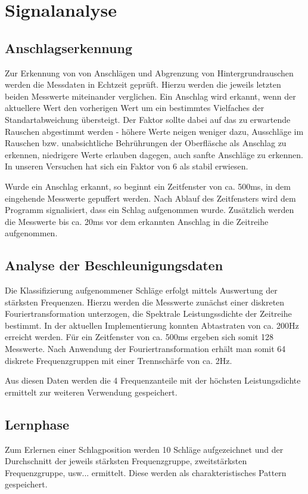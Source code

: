 \section*{Signalanalyse}
\subsection*{Anschlagserkennung}
Zur Erkennung von von Anschlägen und Abgrenzung von Hintergrundrauschen werden die Messdaten in Echtzeit geprüft. Hierzu werden die jeweils letzten beiden Messwerte miteinander verglichen. Ein Anschlag wird erkannt, wenn der aktuellere Wert den vorherigen Wert um ein bestimmtes Vielfaches der Standartabweichung übersteigt. Der Faktor sollte dabei auf das zu erwartende Rauschen abgestimmt werden - höhere Werte neigen weniger dazu, Ausschläge im Rauschen bzw. unabsichtliche Behrührungen der Oberfläsche als Anschlag zu erkennen, niedrigere Werte erlauben dagegen, auch sanfte Anschläge zu erkennen. In unseren Versuchen hat sich ein Faktor von 6 als stabil erwiesen.

Wurde ein Anschlag erkannt, so beginnt ein Zeitfenster von ca. 500ms, in dem eingehende Messwerte gepuffert werden. Nach Ablauf des Zeitfensters wird dem Programm signalisiert, dass ein Schlag aufgenommen wurde. Zusätzlich werden die Messwerte bis ca. 20ms vor dem erkannten Anschlag in die Zeitreihe aufgenommen.

\subsection*{Analyse der Beschleunigungsdaten}
Die Klassifizierung aufgenommener Schläge erfolgt mittels Auswertung der stärksten Frequenzen. Hierzu werden die Messwerte zunächst einer diskreten Fouriertransformation unterzogen, die Spektrale Leistungssdichte der Zeitreihe bestimmt.
In der aktuellen Implementierung konnten Abtastraten von ca. 200Hz erreicht werden. 
Für ein Zeitfenster von ca. 500ms ergeben sich somit 128 Messwerte. 
Nach Anwendung der Fouriertransformation erhält man somit 64 diskrete Frequenzgruppen mit einer Trennschärfe von ca. 2Hz.

Aus diesen Daten werden die 4 Frequenzanteile mit der höchsten Leistungsdichte ermittelt zur weiteren Verwendung gespeichert.

\subsection*{Lernphase}
Zum Erlernen einer Schlagposition werden 10 Schläge aufgezeichnet und der Durchschnitt der jeweils stärksten Frequenzgruppe, zweitstärksten Frequenzgruppe, usw... ermittelt. Diese werden als charakteristisches Pattern gespeichert.

